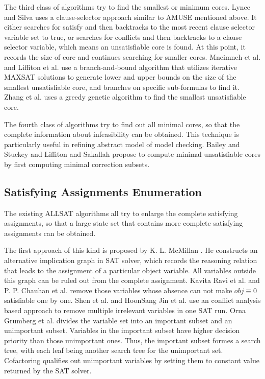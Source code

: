 \documentclass[journal]{IEEEtran}
\begin{document}
The third class of algorithms try to find the smallest or minimum cores.
Lynce and Silva\cite{MINIMUM} uses a clause-selector approach similar to AMUSE\cite{AMUSE} mentioned above. It either searches for satisfy and then backtracks to the most recent clause selector variable set to true, or searches for conflicts and then backtracks to a clause selector variable, which means an unsatisfiable core is found.
At this point, it records the size of core and continues searching for smaller cores.
Mneimneh et al. \cite{BranchBoundSMU} and Liffiton et al. \cite{BranchBoundSMUJ} use a branch-and-bound algorithm that utilizes iterative MAXSAT solutions to generate lower and upper bounds on the size of the smallest unsatisfiable core, and branches on specific sub-formulas to find it.
Zhang et al. \cite{GreedyGenetic} uses a greedy genetic algorithm to find the smallest unsatisfiable core.



The fourth class of algorithms try to find out all minimal cores,
so that the complete information about infeasibility can be obtained.
This technique is particularly useful in refining abstract model of model checking.
Bailey and Stuckey\cite{Hitting} and Liffiton and Sakallah \cite{AlgoMUSC} propose to compute minimal unsatisfiable cores
by first computing minimal correction subsets.


\subsection{Satisfying Assignments Enumeration}\label{subsec_relallsat}

The existing ALLSAT algorithms all try to enlarge the complete satisfying assignments,
so that a large state set that contains more complete satisfying assignments can be obtained.

The first approach of this kind is proposed by K. L. McMillan \cite{SATUNBMC}.
He constructs an alternative implication graph in SAT solver,
which records the reasoning relation that leads to the assignment of a particular object variable.
All variables outside this graph can be ruled out from the complete assignment.
Kavita Ravi et al.\cite{MINASS} and P. P. Chauhan et al.\cite{REPARAM} remove those variables whose absence can not make $obj\equiv 0$ satisfiable one by one.
Shen et al.\cite{MINCEX} and HoonSang Jin et al.\cite{PRIMECLAUSE,EFFCON} use an conflict analysis based approach
to remove multiple irrelevant variables in one SAT run.
Orna Grumberg et al.\cite{MEMEFFALLSAT} divides the variable set into an important subset and an unimportant subset.
Variables in the important subset have higher decision priority than those unimportant ones.
Thus,
the important subset formes a search tree,
with each leaf being another search tree for the unimportant set.
Cofactoring \cite{EFFSATUSMCCO} qualifies out unimportant variables by setting them to constant value returned by the SAT solver.
\end{document}
